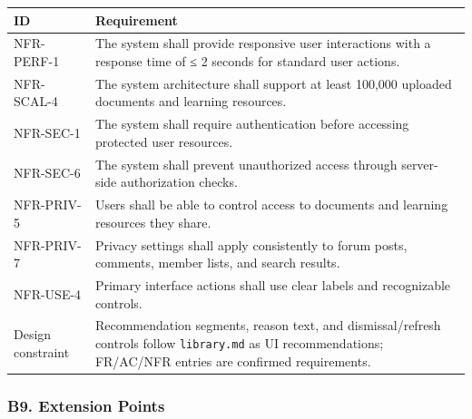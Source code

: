 \documentclass[12pt]{article}
\renewcommand{\baselinestretch}{1.5}
\begin{document}
\begingroup
\small
\renewcommand{\baselinestretch}{1.0}\selectfont
\renewcommand{\arraystretch}{1.15}
\setlength{\tabcolsep}{6pt}
\begin{longtable}{|>{\raggedright\arraybackslash}p{}|>{\raggedright\arraybackslash}p{}|}
\hline
\textbf{ID} & \textbf{Requirement} \\ \hline
\endhead
NFR-PERF-1 & The system shall provide responsive user interactions with a response time of ≤ 2 seconds for standard user actions. \\ \hline
NFR-SCAL-4 & The system architecture shall support at least 100,000 uploaded documents and learning resources. \\ \hline
NFR-SEC-1 & The system shall require authentication before accessing protected user resources. \\ \hline
NFR-SEC-6 & The system shall prevent unauthorized access through server-side authorization checks. \\ \hline
NFR-PRIV-5 & Users shall be able to control access to documents and learning resources they share. \\ \hline
NFR-PRIV-7 & Privacy settings shall apply consistently to forum posts, comments, member lists, and search results. \\ \hline
NFR-USE-4 & Primary interface actions shall use clear labels and recognizable controls. \\ \hline
Design constraint & Recommendation segments, reason text, and dismissal/refresh controls follow \texttt{library.md} as UI recommendations; FR/AC/NFR entries are confirmed requirements. \\ \hline
\end{longtable}
\endgroup
\par\medskip

\hypertarget{sec:b9-extension-points}{}
\subsubsection*{B9. Extension Points}
\par\medskip
\end{document}
